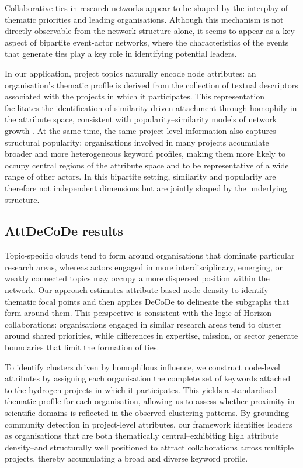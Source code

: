 \documentclass[11pt]{article}
\begin{document}
Collaborative ties in research networks appear to be shaped by the interplay of thematic priorities and leading organisations. 
Although this mechanism is not directly observable from the network structure alone, it seems to appear as a key aspect of bipartite event-actor networks, where the characteristics of the events that generate ties play a key role in identifying potential leaders.
 
 In our application, project topics naturally encode node attributes: an organisation’s thematic profile is derived from the collection of textual descriptors associated with the projects in which it participates. This representation facilitates the identification of similarity-driven attachment through homophily in the attribute space, consistent with popularity–similarity models of network growth \citep{Papadopoulos2012}. At the same time, the same project-level information also captures structural popularity: organisations involved in many projects accumulate broader and more heterogeneous keyword profiles, making them more likely to occupy central regions of the attribute space and to be representative of a wide range of other actors. In this bipartite setting, similarity and popularity are therefore not independent dimensions but are jointly shaped by the underlying structure.

\subsection{AttDeCoDe results}

Topic-specific clouds tend to form around organisations that dominate particular research areas, whereas actors engaged in more interdisciplinary, emerging, or weakly connected topics may occupy a more dispersed position within the network. Our approach estimates attribute-based node density to identify thematic focal points and then applies DeCoDe to delineate the subgraphs that form around them. This perspective is consistent with the logic of Horizon collaborations: organisations engaged in similar research areas tend to cluster around shared priorities, while differences in expertise, mission, or sector generate boundaries that limit the formation of ties.

To identify clusters driven by homophilous influence, we construct node-level attributes by assigning each organisation the complete set of keywords attached to the hydrogen projects in which it participates. This yields a standardised thematic profile for each organisation, allowing us to assess whether proximity in scientific domains is reflected in the observed clustering patterns. By grounding community detection in project-level attributes, our framework identifies leaders as organisations that are both thematically central--exhibiting high attribute density--and structurally well positioned to attract collaborations across multiple projects, thereby accumulating a broad and diverse keyword profile.
\end{document}

